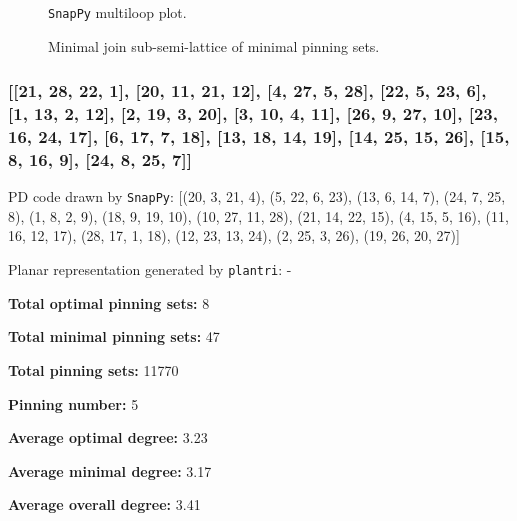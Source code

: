 \documentclass{article}%
\begin{document}
\begin{multicols}{2}
\begin{figure}[H]
\centering

\caption{\texttt{SnapPy} multiloop plot.}
\label{fig:tex/img/[[19, 28, 20, 1], [9, 18, 10, 19], [10, 27, 11, 28], [20, 6, 21, 5], [1, 24, 2, 25], [25, 8, 26, 9], [26, 17, 27, 18], [11, 7, 12, 6], [21, 12, 22, 13], [13, 4, 14, 5], [14, 23, 15, 24], [2, 15, 3, 16.svg}
\end{figure}
\columnbreak

\begin{figure}[H]
\centering
\scalebox{0.8}{}
\caption{Minimal join sub-semi-lattice of minimal pinning sets.}
\label{fig:tex/img/[[19, 28, 20, 1], [9, 18, 10, 19], [10, 27, 11, 28], [20, 6, 21, 5], [1, 24, 2, 25], [25, 8, 26, 9], [26, 17, 27, 18], [11, 7, 12, 6], [21, 12, 22, 13], [13, 4, 14, 5], [14, 23, 15, 24], [2, 15, 3, 16.pgf}
\end{figure}
\end{multicols}

\newpage

\subsubsection{[[21, 28, 22, 1], [20, 11, 21, 12], [4, 27, 5, 28], [22, 5, 23, 6], [1, 13, 2, 12], [2, 19, 3, 20], [3, 10, 4, 11], [26, 9, 27, 10], [23, 16, 24, 17], [6, 17, 7, 18], [13, 18, 14, 19], [14, 25, 15, 26], [15, 8, 16, 9], [24, 8, 25, 7]]}

{\small\noindent PD code drawn by \texttt{SnapPy}: [(20, 3, 21, 4), (5, 22, 6, 23), (13, 6, 14, 7), (24, 7, 25, 8), (1, 8, 2, 9), (18, 9, 19, 10), (10, 27, 11, 28), (21, 14, 22, 15), (4, 15, 5, 16), (11, 16, 12, 17), (28, 17, 1, 18), (12, 23, 13, 24), (2, 25, 3, 26), (19, 26, 20, 27)]}

{\small\noindent Planar representation generated by \texttt{plantri}: -}

\begin{multicols}{2}
{\normalsize \noindent\textbf{Total optimal pinning sets:} 8

\noindent\textbf{Total minimal pinning sets:} 47

\noindent\textbf{Total pinning sets:} 11770

\noindent\textbf{Pinning number:} 5

}
\columnbreak

{\normalsize \noindent\textbf{Average optimal degree:} 3.23

\noindent\textbf{Average minimal degree:} 3.17

\noindent\textbf{Average overall degree:} 3.41

}
\end{multicols}
\end{document}
